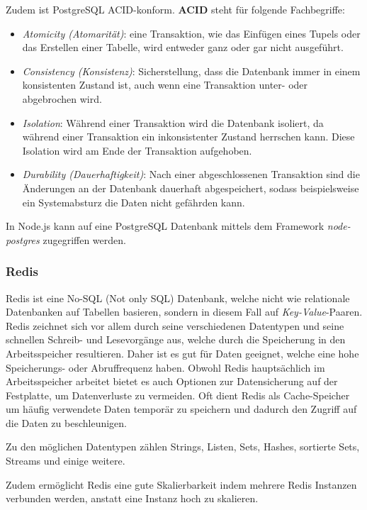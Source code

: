 \documentclass[a4paper,12pt]{report}
\newcommand{\footcite}[1]{\footnotemark\footnotetext{\cite{#1}}}
\begin{document}
Zudem ist PostgreSQL ACID-konform. \textbf{ACID} steht für folgende Fachbegriffe\footcite{sql-book}:
\begin{itemize}
 \item \textit{Atomicity (Atomarität)}: eine Transaktion, wie das Einfügen eines Tupels oder das Erstellen einer Tabelle, wird entweder ganz oder gar nicht ausgeführt.
 \item \textit{Consistency (Konsistenz)}: Sicherstellung, dass die Datenbank immer in einem konsistenten Zustand ist, auch wenn eine Transaktion unter- oder abgebrochen wird.
 \item \textit{Isolation}: Während einer Transaktion wird die Datenbank isoliert, da während einer Transaktion ein inkonsistenter Zustand herrschen kann. Diese Isolation wird am Ende der Transaktion aufgehoben.
  \item \textit{Durability (Dauerhaftigkeit)}: Nach einer abgeschlossenen Transaktion sind die Änderungen an der Datenbank dauerhaft abgespeichert, sodass beispielsweise ein Systemabsturz die Daten nicht gefährden kann.
\end{itemize}

In Node.js kann auf eine PostgreSQL Datenbank mittels dem Framework \textit{node-postgres} zugegriffen werden\footcite{node-postgres}.
        \subsubsection{Redis}
        \label{sec:redis}
Redis ist eine No-SQL (Not only SQL) Datenbank, welche nicht wie relationale Datenbanken auf Tabellen basieren, sondern in diesem Fall auf \textit{Key-Value}-Paaren. Redis zeichnet sich vor allem durch seine verschiedenen Datentypen und seine schnellen Schreib- und Lesevorgänge aus, welche durch die Speicherung in den Arbeitsspeicher resultieren\footcite{redis-book}. Daher ist es gut für Daten geeignet, welche eine hohe Speicherungs- oder Abruffrequenz haben. Obwohl Redis hauptsächlich im Arbeitsspeicher arbeitet bietet es auch Optionen zur Datensicherung auf der Festplatte, um Datenverluste zu vermeiden. Oft dient Redis als Cache-Speicher um häufig verwendete Daten temporär zu speichern und dadurch den Zugriff auf die Daten zu beschleunigen\footcite{redis}. 

Zu den möglichen Datentypen zählen Strings, Listen, Sets, Hashes, sortierte Sets, Streams und einige weitere\footcite{redis}. 	

 Zudem ermöglicht Redis eine gute Skalierbarkeit indem mehrere Redis Instanzen verbunden werden, anstatt eine Instanz hoch zu skalieren.
       
\end{document}
